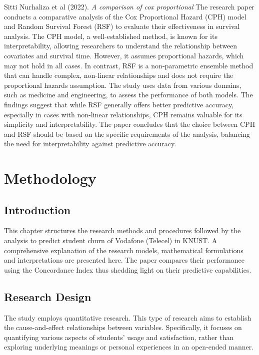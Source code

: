 \documentclass[doublespacing]{report} [12px]%
\begin{document}
Sitti Nurhaliza et al (2022). \textit{A comparison of cox proportional}
The research paper conducts a comparative analysis of the Cox Proportional Hazard (CPH) model and Random Survival Forest (RSF) to evaluate their effectiveness in survival analysis. The CPH model, a well-established method, is known for its interpretability, allowing researchers to understand the relationship between covariates and survival time. However, it assumes proportional hazards, which may not hold in all cases. In contrast, RSF is a non-parametric ensemble method that can handle complex, non-linear relationships and does not require the proportional hazards assumption. The study uses data from various domains, such as medicine and engineering, to assess the performance of both models. The findings suggest that while RSF generally offers better predictive accuracy, especially in cases with non-linear relationships, CPH remains valuable for its simplicity and interpretability. The paper concludes that the choice between CPH and RSF should be based on the specific requirements of the analysis, balancing the need for interpretability against predictive accuracy.




\newpage
\chapter{Methodology}

\section{Introduction}

This chapter structures the research methods and procedures followed by the analysis to predict student churn of Vodafone (Telecel) in KNUST. A comprehensive explanation of the research models, mathematical formulations and interpretations are presented here. The paper compares their performance using the Concordance Index thus shedding light on their predictive capabilities.

\section{Research Design}

The study employs quantitative research. This type of research aims to establish the cause-and-effect relationships between variables. Specifically, it focuses on quantifying various aspects of students’ usage and satisfaction, rather than exploring underlying meanings or personal experiences in an open-ended manner.
\end{document}
